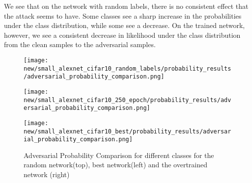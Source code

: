 \documentclass{article}
\begin{document}
            We see that on the network with random labels, there is no consistent effect that the attack seems to have. Some classes see a sharp increase in the probabilities under the class distribution, while some see a decrease. On the trained network, however, we see a consistent decrease in likelihood under the class distribution from the clean samples to the adversarial samples. 
            
            \begin{figure}[H]
                \centering
                \begin{minipage}{0.45\textwidth}
                    \centering
                    \texttt{[image: new/small\_alexnet\_cifar10\_random\_labels/probability\_results/adversarial\_probability\_comparison.png]}
                \end{minipage}
            
                \begin{minipage}{0.45\textwidth}
                    \centering
                    \texttt{[image: new/small\_alexnet\_cifar10\_250\_epoch/probability\_results/adversarial\_probability\_comparison.png]}
                    
                \end{minipage}\hfill
                \begin{minipage}{0.45\textwidth}
                    \centering
                    \texttt{[image: new/small\_alexnet\_cifar10\_best/probability\_results/adversarial\_probability\_comparison.png]}
                \end{minipage}
            
                \caption{Adversarial Probability Comparison for different classes for the random network(top), best network(left) and the overtrained network (right)}
                \label{fig:adversarial_probabilities_small_alexnet}
            \end{figure}
\end{document}
